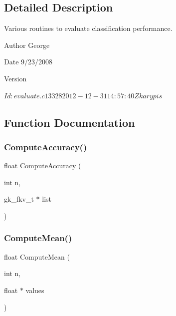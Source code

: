 \subsection{Detailed Description}
Various routines to evaluate classification performance. 

\begin{DoxyAuthor}{Author}
George 
\end{DoxyAuthor}
\begin{DoxyDate}{Date}
9/23/2008 
\end{DoxyDate}
\begin{DoxyVersion}{Version}
\begin{DoxyVerb}$Id: evaluate.c 13328 2012-12-31 14:57:40Z karypis $ \end{DoxyVerb}
 
\end{DoxyVersion}


\subsection{Function Documentation}
\mbox{\label{a00029_ae4d47a20b362605d1521159a9b090a04}} 
\subsubsection{\texorpdfstring{Compute\+Accuracy()}{ComputeAccuracy()}}
{\footnotesize\ttfamily float Compute\+Accuracy (\begin{DoxyParamCaption}\item[{int}]{n,  }\item[{gk\+\_\+fkv\+\_\+t $\ast$}]{list }\end{DoxyParamCaption})}

\mbox{\label{a00029_aeeed505299d523a6061b0c1966d88427}} 
\subsubsection{\texorpdfstring{Compute\+Mean()}{ComputeMean()}}
{\footnotesize\ttfamily float Compute\+Mean (\begin{DoxyParamCaption}\item[{int}]{n,  }\item[{float $\ast$}]{values }\end{DoxyParamCaption})}

